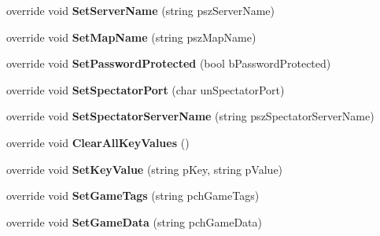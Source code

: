 \begin{DoxyCompactItemize}
override void {\bfseries Set\+Server\+Name} (string psz\+Server\+Name)
\item 
\mbox{\label{class_valve_1_1_steamworks_1_1_c_steam_game_server_aa6f4a5dc92d99f5db03ae2c29a9385f6}} 
override void {\bfseries Set\+Map\+Name} (string psz\+Map\+Name)
\item 
\mbox{\label{class_valve_1_1_steamworks_1_1_c_steam_game_server_a6c18172152812252d4ef81a02ffdeae5}} 
override void {\bfseries Set\+Password\+Protected} (bool b\+Password\+Protected)
\item 
\mbox{\label{class_valve_1_1_steamworks_1_1_c_steam_game_server_ac28fbb9b5e5fee3f69f0712caae42c84}} 
override void {\bfseries Set\+Spectator\+Port} (char un\+Spectator\+Port)
\item 
\mbox{\label{class_valve_1_1_steamworks_1_1_c_steam_game_server_a9c0350ea4ef3f4061558ee024d310b33}} 
override void {\bfseries Set\+Spectator\+Server\+Name} (string psz\+Spectator\+Server\+Name)
\item 
\mbox{\label{class_valve_1_1_steamworks_1_1_c_steam_game_server_ad1bd36dc89100f64b65c630653085a52}} 
override void {\bfseries Clear\+All\+Key\+Values} ()
\item 
\mbox{\label{class_valve_1_1_steamworks_1_1_c_steam_game_server_a79edc329c5b3ed22db72cfd38e1ae4ce}} 
override void {\bfseries Set\+Key\+Value} (string p\+Key, string p\+Value)
\item 
\mbox{\label{class_valve_1_1_steamworks_1_1_c_steam_game_server_a19acd2753fc8bea1577163bfd89f11d2}} 
override void {\bfseries Set\+Game\+Tags} (string pch\+Game\+Tags)
\item 
\mbox{\label{class_valve_1_1_steamworks_1_1_c_steam_game_server_a8c6e5c3c956140344f01b481d2ed626b}} 
override void {\bfseries Set\+Game\+Data} (string pch\+Game\+Data)

\end{DoxyCompactItemize}
